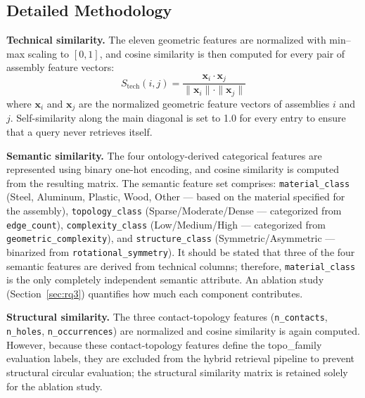 \documentclass[preprint,12pt]{elsarticle}
\begin{document}
\subsection{Detailed Methodology}

\textbf{Technical similarity.} The eleven geometric features are normalized with min--max scaling to $[0,1]$, and cosine similarity is then computed for every pair of assembly feature vectors:
\begin{equation}
S_{\text{tech}}(i,j) = \frac{\mathbf{x}_i \cdot \mathbf{x}_j}{\|\mathbf{x}_i\| \cdot \|\mathbf{x}_j\|}
\label{Eq:CosineSim}
\end{equation}
where $\mathbf{x}_i$ and $\mathbf{x}_j$ are the normalized geometric feature vectors of assemblies $i$ and $j$.
Self-similarity along the main diagonal is set to 1.0 for every entry to ensure that a query never retrieves itself.

\textbf{Semantic similarity.} The four ontology-derived categorical features are represented using binary one-hot encoding, and cosine similarity is computed from the resulting matrix.
The semantic feature set comprises: \texttt{material\_class} (Steel, Aluminum, Plastic, Wood, Other --- based on the material specified for the assembly), \texttt{topology\_class} (Sparse/Moderate/Dense --- categorized from \texttt{edge\_count}), \texttt{complexity\_class} (Low/Medium/High --- categorized from \texttt{geometric\_complexity}), and \texttt{structure\_class} (Symmetric/Asymmetric --- binarized from \texttt{rotational\_symmetry}).
It should be stated that three of the four semantic features are derived from technical columns; therefore, \texttt{material\_class} is the only completely independent semantic attribute. An ablation study (Section~\ref{sec:rq3}) quantifies how much each component contributes.

\textbf{Structural similarity.} The three contact-topology features (\texttt{n\_contacts}, \texttt{n\_holes}, \texttt{n\_occurrences}) are normalized and cosine similarity is again computed.
However, because these contact-topology features define the topo\_family evaluation labels, they are excluded from the hybrid retrieval pipeline to prevent structural circular evaluation; the structural similarity matrix is retained solely for the ablation study.
\end{document}
